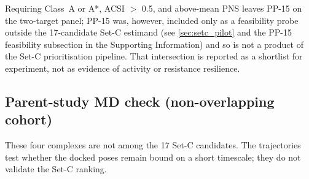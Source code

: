 \documentclass[journal=jcisd8,manuscript=article,layout=traditional]{achemso}
\begin{document}
Requiring Class~A or A*, ACSI $>$ \num{0.5}, and above-mean PNS leaves PP-15 on the two-target panel; PP-15 was, however, included only as a feasibility probe outside the \num{17}-candidate Set-C estimand (see \cref{sec:setc_pilot} and the PP-15 feasibility subsection in the Supporting Information) and so is not a product of the Set-C prioritisation pipeline. That intersection is reported as a shortlist for experiment, not as evidence of activity or resistance resilience.

\subsection{Parent-study MD check (non-overlapping cohort)}

These four complexes are not among the 17 Set-C candidates. The trajectories test whether the docked poses remain bound on a short timescale; they do not validate the Set-C ranking.

\begin{table}[htbp]
\centering
\caption[MD stability metrics]{Production MD stability metrics for parent-study wild-type complexes (\qty{10}{\nano\second}). BB RMSD, ligand RMSD, minimum distance, contacts, and H-bonds are computed from PBC-unwrapped trajectories.}
\label{tab:md_stability}
\end{table}
\end{document}
